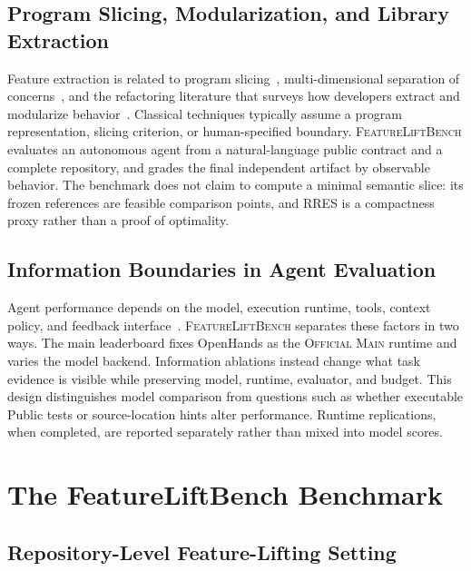 \documentclass[acmsmall,anonymous,review,screen]{acmart}
\newcommand{\flb}{\textsc{FeatureLiftBench}\xspace}
\newcommand{\rres}{\textsc{RRES}\xspace}
\newcommand{\mainprotocol}{\textsc{Official Main}\xspace}
\begin{document}
\subsection{Program Slicing, Modularization, and Library Extraction}

Feature extraction is related to program slicing~\cite{weiser1984slicing},
multi-dimensional separation of concerns~\cite{tarr1999degrees}, and the
refactoring literature that surveys how developers extract and modularize
behavior~\cite{mens2004refactoring}. Classical techniques typically assume a
program representation, slicing criterion, or human-specified boundary. \flb
evaluates an autonomous agent from a natural-language public contract and a
complete repository, and grades the final independent artifact by observable
behavior. The benchmark does not claim to compute a minimal semantic slice: its
frozen references are feasible comparison points, and \rres is a compactness
proxy rather than a proof of optimality.

\subsection{Information Boundaries in Agent Evaluation}

Agent performance depends on the model, execution runtime, tools, context
policy, and feedback interface~\cite{yang2024sweagent,wang2024openhands,yao2026harnessbench}.
\flb separates these factors in two ways. The main leaderboard fixes OpenHands
as the \mainprotocol runtime and varies the model backend. Information
ablations instead change what task evidence is visible while preserving model,
runtime, evaluator, and budget. This design distinguishes model comparison from
questions such as whether executable Public tests or source-location hints
alter performance. Runtime replications, when completed, are reported
separately rather than mixed into model scores.


\section{The FeatureLiftBench Benchmark}
\label{sec:benchmark}

\subsection{Repository-Level Feature-Lifting Setting}
\end{document}
